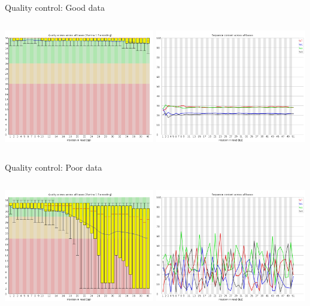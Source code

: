 \documentclass[10pt]{beamer}
\begin{document}
\begin{frame}{Quality control: Good data}
	\begin{columns}[T]
		\column{\dimexpr\paperwidth-10pt}
		\includegraphics[width=0.493\textwidth]{./figures/fastqc-good.png}
		\includegraphics[width=0.493\textwidth]{./figures/fastqc-good2.png}
	\end{columns}
\end{frame}

\begin{frame}{Quality control: Poor data}
	\begin{columns}[T]
		\column{\dimexpr\paperwidth-10pt}
		\includegraphics[width=0.493\textwidth]{./figures/fastqc-ugly.png}
		\includegraphics[width=0.493\textwidth]{./figures/fastqc-ugly2.png}
	\end{columns}
\end{frame}
\end{document}
